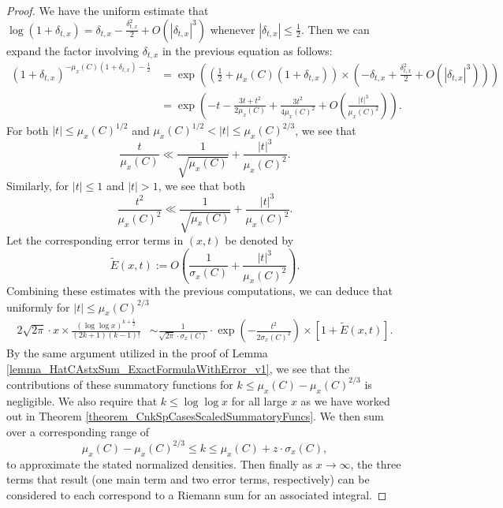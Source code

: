 \documentclass[11pt,reqno,a4letter]{article}
\numberwithin{figure}{section}
\numberwithin{table}{section}
\theoremstyle{plain}
\numberwithin{theorem}{section}
\theoremstyle{definition}
\begin{document}
\begin{proof}
We have the uniform estimate that 
$\log(1+\delta_{t,x}) = \delta_{t,x} - \frac{\delta_{t,x}^2}{2} + O(|\delta_{t,x}|^3)$ whenever 
$|\delta_{t,x}| \leq \frac{1}{2}$. Then we can expand the factor involving $\delta_{t,x}$ 
in the previous equation as follows: 
\begin{align*} 
(1+\delta_{t,x})^{-\mu_x(C) (1+\delta_{t,x}) - \frac{1}{2}} & = 
     \exp\left(\left(\frac{1}{2}+\mu_x(C) (1+\delta_{t,x})\right) \times 
     \left(-\delta_{t,x} + \frac{\delta_{t,x}^2}{2} + O(|\delta_{t,x}|^3)\right)\right) \\ 
     & = \exp\left(-t - \frac{3t+t^2}{2\mu_x(C)} + \frac{3t^2}{4\mu_x(C)^2} + 
     O\left(\frac{|t|^3}{\mu_x(C)^2}\right)\right). 
\end{align*} 
For both $|t| \leq \mu_x(C)^{1/2}$ and 
$\mu_x(C)^{1/2} < |t| \leq \mu_x(C)^{2/3}$, 
we see that 
\[
\frac{t}{\mu_x(C)} \ll \frac{1}{\sqrt{\mu_x(C)}} + \frac{|t|^3}{\mu_x(C)^2}. 
\]
Similarly, for $|t| \leq 1$ and $|t| > 1$, we see that both 
\[
\frac{t^2}{\mu_x(C)^2} \ll \frac{1}{\sqrt{\mu_x(C)}} + 
     \frac{|t|^3}{\mu_x(C)^2}. 
\] 
Let the corresponding error terms in $(x, t)$ be denoted by 
\[
\widetilde{E}(x, t) := O\left(\frac{1}{\sigma_x(C)} + \frac{|t|^3}{\mu_x(C)^2}\right). 
\]
Combining these estimates with the previous computations, we can deduce that 
uniformly for $|t| \leq \mu_x(C)^{2/3}$ 
\begin{align*} 
2\sqrt{2\pi} \cdot x \times 
     \frac{(\log\log x)^{k+\frac{1}{2}}}{(2k+1)(k-1)!} & \sim 
     \frac{1}{\sqrt{2\pi} \cdot \sigma_x(C)} 
     \cdot \exp\left(-\frac{t^2}{2\sigma_x(C)^2}\right) \times 
     \left[1 + \widetilde{E}(x, t)\right]. 
\end{align*} 
By the same argument utilized in the proof of 
Lemma \ref{lemma_HatCAstxSum_ExactFormulaWithError_v1}, we see that 
the contributions of these summatory functions for 
$k \leq \mu_x(C) - \mu_x(C)^{2/3}$ is negligible. 
We also require that $k \leq \log\log x$ for all large $x$ as we have worked out in 
Theorem \ref{theorem_CnkSpCasesScaledSummatoryFuncs}. We then sum over a 
corresponding range of 
\[
\mu_x(C) -\mu_x(C)^{2/3} \leq k \leq \mu_x(C) + z \cdot \sigma_x(C), 
\] 
to approximate the stated normalized densities. 
Then finally as $x \rightarrow \infty$, the 
three terms that result (one main term and two error terms, respectively) 
can be considered to each correspond to a Riemann sum for an associated integral. 
\end{proof} 
\end{document}
